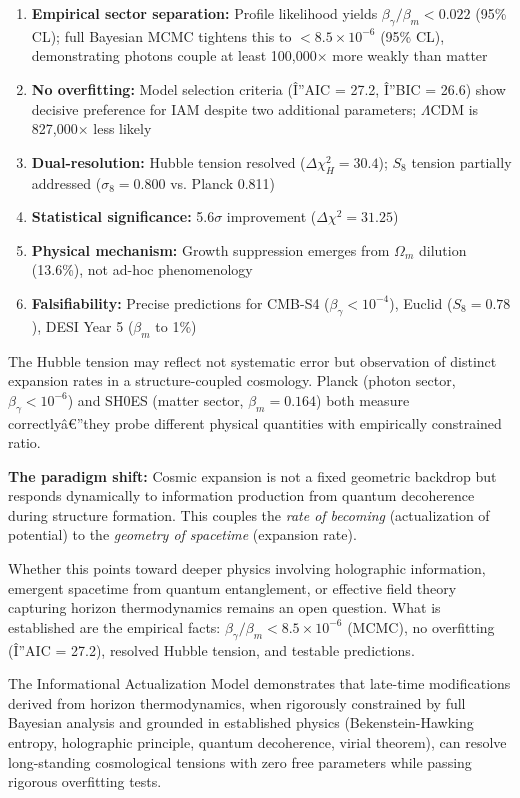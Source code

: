 \documentclass[twocolumn,superscriptaddress,prl,amsmath,amssymb]{revtex4-2}
\begin{document}
\begin{enumerate}
\item \textbf{Empirical sector separation:} Profile likelihood yields $\beta_\gamma/\beta_m < 0.022$ (95\% CL); full Bayesian MCMC tightens this to $< 8.5 \times 10^{-6}$ (95\% CL), demonstrating photons couple at least 100,000$\times$ more weakly than matter
\item \textbf{No overfitting:} Model selection criteria (Î”AIC = 27.2, Î”BIC = 26.6) show decisive preference for IAM despite two additional parameters; $\Lambda$CDM is 827,000$\times$ less likely
\item \textbf{Dual-resolution:} Hubble tension resolved ($\Delta\chi^2_H = 30.4$); $S_8$ tension partially addressed ($\sigma_8 = 0.800$ vs. Planck 0.811)
\item \textbf{Statistical significance:} 5.6$\sigma$ improvement ($\Delta\chi^2 = 31.25$)
\item \textbf{Physical mechanism:} Growth suppression emerges from $\Omega_m$ dilution (13.6\%), not ad-hoc phenomenology
\item \textbf{Falsifiability:} Precise predictions for CMB-S4 ($\beta_\gamma < 10^{-4}$), Euclid ($S_8 = 0.78$), DESI Year 5 ($\beta_m$ to 1\%)
\end{enumerate}

The Hubble tension may reflect not systematic error but observation of distinct expansion rates in a structure-coupled cosmology. Planck (photon sector, $\beta_\gamma < 10^{-6}$) and SH0ES (matter sector, $\beta_m = 0.164$) both measure correctlyâ€”they probe different physical quantities with empirically constrained ratio.

\textbf{The paradigm shift:} Cosmic expansion is not a fixed geometric backdrop but responds dynamically to information production from quantum decoherence during structure formation. This couples the \textit{rate of becoming} (actualization of potential) to the \textit{geometry of spacetime} (expansion rate).

Whether this points toward deeper physics involving holographic information, emergent spacetime from quantum entanglement, or effective field theory capturing horizon thermodynamics remains an open question. What is established are the empirical facts: $\beta_\gamma/\beta_m < 8.5 \times 10^{-6}$ (MCMC), no overfitting (Î”AIC = 27.2), resolved Hubble tension, and testable predictions.

The Informational Actualization Model demonstrates that late-time modifications derived from horizon thermodynamics, when rigorously constrained by full Bayesian analysis and grounded in established physics (Bekenstein-Hawking entropy, holographic principle, quantum decoherence, virial theorem), can resolve long-standing cosmological tensions with zero free parameters while passing rigorous overfitting tests.
\end{document}
